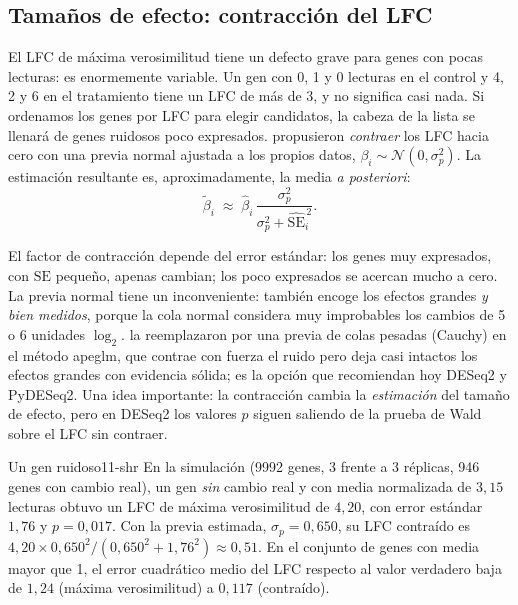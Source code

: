 \subsection{Tamaños de efecto: contracción del LFC}

El LFC de máxima verosimilitud tiene un defecto grave para genes con pocas lecturas: es enormemente variable. Un gen con 0, 1 y 0 lecturas en el control y 4, 2 y 6 en el tratamiento tiene un LFC de más de 3, y no significa casi nada. Si ordenamos los genes por LFC para elegir candidatos, la cabeza de la lista se llenará de genes ruidosos poco expresados. \textcite{c11-love2014} propusieron \emph{contraer} los LFC hacia cero con una previa normal ajustada a los propios datos, $\beta_i\sim\mathcal N(0,\sigma_p^2)$. La estimación resultante es, aproximadamente, la media \emph{a posteriori}:
\begin{equation}\label{eq:11-shrink}
\tilde\beta_i\;\approx\;\hat\beta_i\,\frac{\sigma_p^2}{\sigma_p^2+\widehat{\mathrm{SE}}_i^{\,2}}.
\end{equation}

\begin{simbolos}
\end{simbolos}

El factor de contracción depende del error estándar: los genes muy expresados, con $\mathrm{SE}$ pequeño, apenas cambian; los poco expresados se acercan mucho a cero. La previa normal tiene un inconveniente: también encoge los efectos grandes \emph{y bien medidos}, porque la cola normal considera muy improbables los cambios de 5 o 6 unidades $\log_2$. \textcite{c11-zhu2019} la reemplazaron por una previa de colas pesadas (Cauchy) en el método apeglm, que contrae con fuerza el ruido pero deja casi intactos los efectos grandes con evidencia sólida; es la opción que recomiendan hoy DESeq2 y PyDESeq2. Una idea importante: la contracción cambia la \emph{estimación} del tamaño de efecto, pero en DESeq2 los valores $p$ siguen saliendo de la prueba de Wald sobre el LFC sin contraer.

\begin{ejemplo}{Un gen ruidoso}{11-shr}
En la simulación (\num{9992} genes, 3 frente a 3 réplicas, \num{946} genes con cambio real), un gen \emph{sin} cambio real y con media normalizada de $3{,}15$ lecturas obtuvo un LFC de máxima verosimilitud de $4{,}20$, con error estándar $1{,}76$ y $p=0{,}017$. Con la previa estimada, $\sigma_p=0{,}650$, su LFC contraído es $4{,}20\times0{,}650^2/(0{,}650^2+1{,}76^2)\approx0{,}51$. En el conjunto de genes con media mayor que 1, el error cuadrático medio del LFC respecto al valor verdadero baja de $1{,}24$ (máxima verosimilitud) a $0{,}117$ (contraído).
\end{ejemplo}

